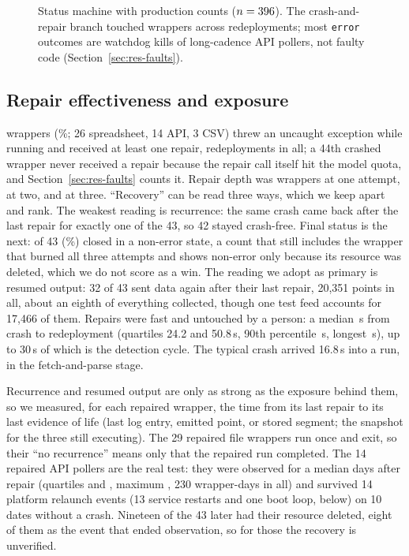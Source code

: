 \documentclass[conference]{IEEEtran}
\begin{document}


\begin{figure}[t]
\centering
\resizebox{0.80\columnwidth}{!}{}
\caption{Status machine with production counts ($n=396{}$). The
crash-and-repair branch touched \nRetried{} wrappers across \nHealEvents{}
redeployments; most \texttt{error} outcomes are watchdog kills of long-cadence API
pollers, not faulty code (Section~\ref{sec:res-faults}).}
\label{fig:lifecycle}
\end{figure}

\subsection{Repair effectiveness and exposure}
\label{sec:res-heal}
\nRetried{} wrappers (\pctRetried\%; 26 spreadsheet, 14 API, 3 CSV) threw an
uncaught exception while running and received at least one repair, \nHealEvents{}
redeployments in all; a 44th crashed wrapper
never received a repair because the repair call itself hit the model quota, and
Section~\ref{sec:res-faults} counts it. Repair depth was \retryOnce{} wrappers at one
attempt, \retryTwice{} at two, and \retryThrice{} at three. ``Recovery'' can be read
three ways, which we keep apart and rank. The weakest
reading is recurrence: the same crash came back after the last repair for exactly one
of the 43, so 42 stayed crash-free. Final status is the next: \nRecovered{} of 43
(\pctRecovered\%) closed in a non-error state, a count that still includes the
wrapper that burned all three attempts and shows non-error only because its resource
was deleted, which we do not score as a win. The reading we adopt as
primary is resumed output: 32 of 43 sent data again after their last repair, 20{,}351
points in all, about an eighth of everything collected, though one test feed accounts
for 17{,}466 of them. Repairs were fast and untouched by a person: a median
\healLatencyMedian{}\,s from crash to redeployment (quartiles 24.2 and 50.8\,s, 90th percentile \healLatencyPninety{}\,s, longest \healLatencyMax{}\,s), up to 30\,s of
which is the detection cycle. The typical crash arrived 16.8\,s into a run, in the
fetch-and-parse stage.

Recurrence and resumed output are only as strong as the exposure behind them, so we
measured, for each repaired wrapper, the time from its last repair to its last
evidence of life (last log entry, emitted point, or stored segment; the snapshot
for the three still executing). The 29 repaired file wrappers run once and exit, so
their ``no recurrence'' means only that the repaired run completed. The 14 repaired API pollers are the real test: they were
observed for a median \expApiMedianDays{} days after repair (quartiles \expApiQone{}
and \expApiQthree{}, maximum \expMaxDays{}, 230 wrapper-days in all) and survived 14 platform relaunch events (13 service restarts and one boot loop,
below) on 10 dates without a crash. Nineteen of the 43 later had their resource
deleted, eight of them as the event that ended observation, so for those the recovery
is unverified.
\end{document}
